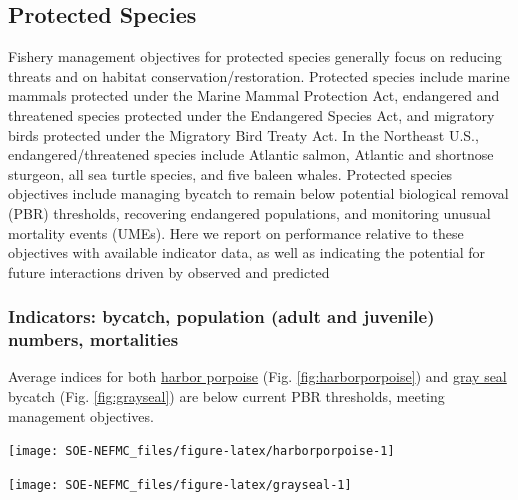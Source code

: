 \documentclass[
  10pt,
]{article}
\let\origfigure\figure
\let\endorigfigure\endfigure
\renewenvironment{figure}[1][2] {
    \expandafter\origfigure\expandafter[H]
} {
    \endorigfigure
}
\begin{document}
\hypertarget{protected-species}{%
\subsection{Protected Species}\label{protected-species}}

Fishery management objectives for protected species generally focus on reducing threats and on habitat conservation/restoration. Protected species include marine mammals protected under the Marine Mammal Protection Act, endangered and threatened species protected under the Endangered Species Act, and migratory birds protected under the Migratory Bird Treaty Act. In the Northeast U.S., endangered/threatened species include Atlantic salmon, Atlantic and shortnose sturgeon, all sea turtle species, and five baleen whales. Protected species objectives include managing bycatch to remain below potential biological removal (PBR) thresholds, recovering endangered populations, and monitoring unusual mortality events (UMEs). Here we report on performance relative to these objectives with available indicator data, as well as indicating the potential for future interactions driven by observed and predicted

\hypertarget{indicators-bycatch-population-adult-and-juvenile-numbers-mortalities}{%
\subsubsection{Indicators: bycatch, population (adult and juvenile) numbers, mortalities}\label{indicators-bycatch-population-adult-and-juvenile-numbers-mortalities}}

Average indices for both \href{https://noaa-edab.github.io/catalog/harborporpoise.html}{harbor porpoise} (Fig. \ref{fig:harborporpoise}) and \href{https://noaa-edab.github.io/catalog/grayseal.html}{gray seal} bycatch (Fig. \ref{fig:grayseal}) are below current PBR thresholds, meeting management objectives.

\begin{figure}

{\centering \texttt{[image: SOE-NEFMC\_files/figure-latex/harborporpoise-1]} 

}

\caption{Harbor porpoise average bycatch estimate for Mid-Atlantic and New England gillnet fisheries (blue) and the potential biological removal (red).}\label{fig:harborporpoise}
\end{figure}
\begin{figure}

{\centering \texttt{[image: SOE-NEFMC\_files/figure-latex/grayseal-1]} 

}

\caption{Gray Seal average bycatch estimate for gillnet fisheries (blue) and the potential biological removal (red).}\label{fig:grayseal}
\end{figure}
\end{document}
